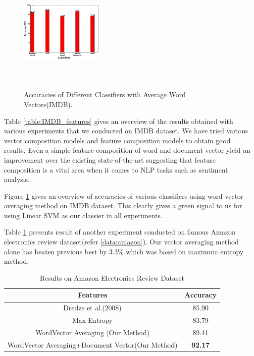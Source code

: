 \documentclass[11pt,a4paper]{article}
\begin{document}
\begin{figure}[H]
\centering
\small
\includegraphics[width=40mm, height=60mm]{img/accuracy_wordvectors.eps}
\caption{Accuracies of Different Classifiers with Average Word Vectors(IMDB). \label{fig:accuracy_wordvectors}}
\end{figure}

Table \ref{table:IMDB_features} gives an overview of the results obtained with various experiments that we conducted on IMDB dataset. We have tried various vector composition models and feature composition models to obtain good results. Even a simple feature composition of word and document vector yield an improvement over the existing state-of-the-art suggesting that feature composition is a vital area when it comes to NLP tasks such as sentiment analysis.

Figure \ref{fig:accuracy_wordvectors} gives an overview of accuracies of various classifiers using word vector averaging method on IMDB dataset. This clearly gives a green signal to us for using Linear SVM as our classier in all experiments.



Table \ref{table:amazon} presents result of another experiment conducted on famous Amazon electronics review dataset(refer \ref{data:amazon}). Our vector averaging method alone has beaten previous best by 3.3\% which was based on maximum entropy method.
\begin {table}[H]
\centering
\small
\begin{tabular}{ | c | c | }
\hline
\textbf{Features} & \textbf{Accuracy} \\ \hline
Dredze et al.(2008) & 85.90\\ \hline
Max Entropy & 83.79\\ \hline
WordVector Averaging (Our Method) & 89.41\\ \hline
WordVector Averaging+Document Vector(Our Method) & \textbf{92.17}\\ \hline
\end{tabular}
\caption {Results on Amazon Electronics Review Dataset}
\label{table:amazon}
\end{table}
\end{document}
